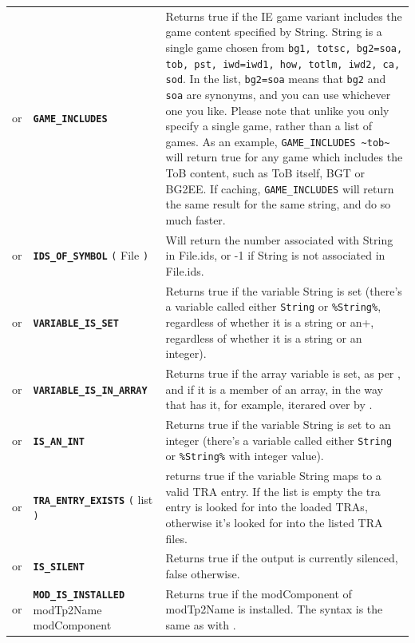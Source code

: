 \documentclass{article}
\def\ttref#1{\ahrefloc{#1}{\tt #1}}
\def\DEFINE#1{{\tt \bf #1}\label{#1}\index{#1}}
\def\DEFSYN#1{{\tt \bf #1}\index{#1}}
\def\t#1{{\tt #1}}
\def\Slist{{\color{red} list }}
\begin{document}
\begin{tabular}{cp{10in}|p{10in}}
or & \DEFINE{GAME_INCLUDES} \ttref{Caching} \ttref{String} &

Returns true if the IE game variant includes the game content
specified by String. String is a single game chosen from
\verb+bg1, totsc, bg2=soa, tob, pst, iwd=iwd1, how, totlm, iwd2, ca, sod+. In
the list, \verb+bg2=soa+ means that \verb+bg2+ and \verb+soa+ are
synonyms, and you can use whichever one you like. Please note that
unlike \ttref{GAME_IS} you only specify a single game, rather than a
list of games. As an example, \verb+GAME_INCLUDES ~tob~+ will return
true for any game which includes the ToB content, such as ToB itself,
BGT or BG2EE. If caching, \t{GAME_INCLUDES} will return the same
result for the same string, and do so much faster. \\

or & \DEFINE{IDS_OF_SYMBOL} \t{(} File \ttref{String} \t{)} &
Will return the number associated with String in File.ids,
or -1 if String is not associated in File.ids. \\

or & \DEFINE{VARIABLE_IS_SET} \ttref{String} &
Returns true if the variable String is set (there's a variable called either
\verb+String+ or \verb+%String%+, regardless of whether it is a string or an
integer).  \\

or & \DEFINE{VARIABLE_IS_IN_ARRAY} \ttref{array construct} &
Returns true if the array variable is set, as per
\ttref{VARIABLE_IS_SET}, and if it is a member of an array, in the way
that has it, for example, iterared over by \ttref{PHP_EACH}. \\

or & \DEFSYN{IS_AN_INT} \ttref{String} &
Returns true if the variable String is set to an integer (there's a variable called either
\verb+String+ or \verb+%String%+ with integer value).  \\
or & \DEFINE{TRA_ENTRY_EXISTS} \t{(} \ttref{String} \ttref{String} \Slist \t{)} &
	returns true if the variable String maps to a valid TRA entry.
	If the \ttref{String} list is empty the tra entry is looked for into the loaded TRAs,
	otherwise it's looked for into the listed TRA files.
\\
or & \DEFSYN{IS_SILENT} &
Returns true if the output is currently silenced, false otherwise.  \\

or & \DEFINE{MOD_IS_INSTALLED} modTp2Name modComponent &
Returns true if the modComponent of modTp2Name is installed. The syntax
is the same as with \ttref {REQUIRE_COMPONENT}.  \\


\end{tabular}
\end{document}
